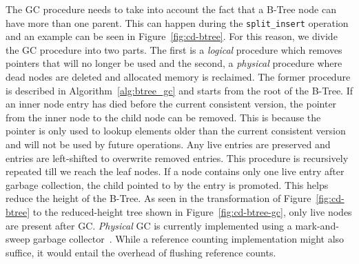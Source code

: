 The GC procedure needs to take into account the fact that a B-Tree node
can have more than one parent. This can happen during the
 \texttt{split\_insert} operation and an example can be seen in
Figure~\ref{fig:cd-btree}. For this reason, we divide the GC procedure
into two parts. The first is a \textit{logical} procedure which removes
pointers that will no longer be used and the second, a \textit{physical}
procedure where dead nodes are deleted and allocated memory is
reclaimed.  The former procedure is described in
Algorithm~\ref{alg:btree_gc} and starts from the root of the B-Tree.
If an inner node entry has died before the current consistent version,
the pointer from the inner node to the child node can be removed.
This is because the pointer is only used to lookup elements older than
the current consistent version and will not be used by future operations.
Any live entries are preserved and entries are left-shifted to overwrite
removed entries. This procedure is recursively repeated till we reach the leaf
nodes.  If a node contains only one live entry after garbage collection, 
the child pointed to by the entry is promoted.  This helps reduce the height
of the B-Tree.  As seen in the transformation of Figure~\ref{fig:cd-btree} to
the reduced-height tree shown in Figure~\ref{fig:cd-btree-gc}, only live
nodes are present after GC\@.  \textit{Physical} GC is currently implemented
using a mark-and-sweep garbage collector~\citep{Boehm98}.  While a reference
counting implementation might also suffice, it would entail the overhead of
flushing reference counts.





